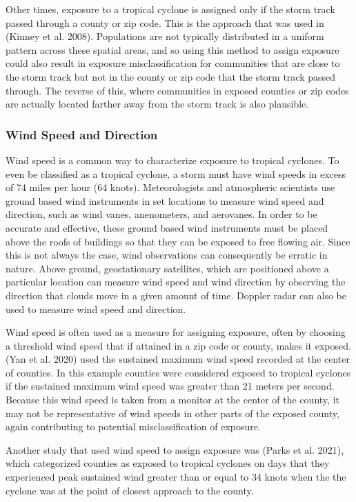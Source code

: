 \documentclass[
]{article}
\begin{document}
Other times, exposure to a tropical cyclone is assigned only if the
storm track passed through a county or zip code. This is the approach
that was used in (Kinney et al. 2008). Populations are not typically
distributed in a uniform pattern across these spatial areas, and so
using this method to assign exposure could also result in exposure
misclassification for communities that are close to the storm track but
not in the county or zip code that the storm track passed through. The
reverse of this, where communities in exposed counties or zip codes are
actually located farther away from the storm track is also plausible.

\hypertarget{wind-speed-and-direction}{%
\subsubsection{Wind Speed and
Direction}\label{wind-speed-and-direction}}

Wind speed is a common way to characterize exposure to tropical
cyclones. To even be classified as a tropical cyclone, a storm must have
wind speeds in excess of 74 miles per hour (64 knots). Meteorologists
and atmospheric scientists use ground based wind instruments in set
locations to measure wind speed and direction, such as wind vanes,
anenometers, and aerovanes. In order to be accurate and effective, these
ground based wind instruments must be placed above the roofs of
buildings so that they can be exposed to free flowing air. Since this is
not always the case, wind observations can consequently be erratic in
nature. Above ground, geostationary satellites, which are positioned
above a particular location can measure wind speed and wind direction by
observing the direction that clouds move in a given amount of time.
Doppler radar can also be used to measure wind speed and direction.

Wind speed is often used as a measure for assigning exposure, often by
choosing a threshold wind speed that if attained in a zip code or
county, makes it exposed. (Yan et al. 2020) used the sustained maximum
wind speed recorded at the center of counties. In this example counties
were considered exposed to tropical cyclones if the sustained maximum
wind speed was greater than 21 meters per second. Because this wind
speed is taken from a monitor at the center of the county, it may not be
representative of wind speeds in other parts of the exposed county,
again contributing to potential misclassification of exposure.

Another study that used wind speed to assign exposure was (Parks et al.
2021), which categorized counties as exposed to tropical cyclones on
days that they experienced peak sustained wind greater than or equal to
34 knots when the the cyclone was at the point of closest approach to
the county.
\end{document}
